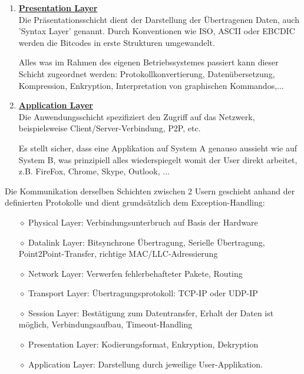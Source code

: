 \documentclass[11pt]{article}
\begin{document}
\begin{enumerate}
        \emph{Protokolle}:
        \begin{addmargin}[1em]{1em}
            - ISO 8326 - OSI protocol suite: Neuverbindungsaufbau nach Störungen
            - ZIP - Zone Information Protocol (AppleTalk)
            - SMB - Server Message Block
            - RPC - Remote Procedure Call
        \end{addmargin}

        Wenn man beispielsweise eine Website aufruft, so startet der Layer eine 'Session' mit dem jeweiligen Webserver.
        \emph{Heutzutage definiert via https; nicht explizit vorhanden.}

        \item \textbf{\underline{Presentation Layer}}\\
        Die Präsentationsschicht dient der Darstellung der Übertragenen Daten, auch 'Syntax Layer' genannt.
        Durch Konventionen wie ISO, ASCII oder EBCDIC werden die Bitcodes in erste Strukturen umgewandelt.

        Alles was im Rahmen des eigenen Betriebssystemes passiert kann dieser Schicht zugeordnet werden: Protokollkonvertierung,
        Datenübersetzung, Kompression, Enkryption, Interpretation von graphischen Kommandos,...

        \item \textbf{\underline{Application Layer}}\\
        Die Anwendungsschicht spezifiziert den Zugriff auf das Netzwerk, beispielsweise Client/Server-Verbindung, P2P, etc.

        Es stellt sicher, dass eine Applikation auf System A genauso aussieht wie auf System B, was
        prinzipiell alles wiederspiegelt womit der User direkt arbeitet, z.B. FireFox, Chrome, Skype, Outlook, ...\\

    \end{enumerate}

    Die Kommunikation derselben Schichten zwischen 2 Usern geschieht anhand der definierten Protokolle und dient grundsätzlich dem Exception-Handling:
\begin{itemize}
    \item[$\diamond$] Physical Layer: Verbindungsunterbruch auf Basis der Hardware
    \item[$\diamond$] Datalink Layer: Bitsynchrone Übertragung, Serielle Übertragung, Point2Point-Transfer, richtige MAC/LLC-Adressierung
    \item[$\diamond$] Network Layer: Verwerfen fehlerbehafteter Pakete, Routing
    \item[$\diamond$] Transport Layer: Übertragungsprotokoll: TCP-IP oder UDP-IP
    \item[$\diamond$] Session Layer: Bestätigung zum Datentransfer, Erhalt der Daten ist möglich, Verbindungsaufbau, Timeout-Handling
    \item[$\diamond$] Presentation Layer: Kodierungsformat, Enkryption, Dekryption
    \item[$\diamond$] Application Layer: Darstellung durch jeweilige User-Applikation.
\end{itemize}
\end{document}
